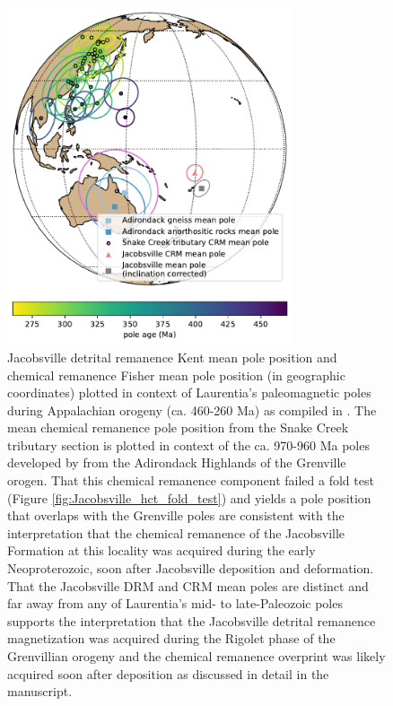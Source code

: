 \begin{figure}
\centering
\includegraphics[width=0.75\textwidth]{figure/Zhang2024a/SI_Jacobsville_vs_Appalachian_poles.pdf}
\caption[Jacobsville detrital remanence pole position in context of Laurentia's paleomagnetic poles during the Appalachian orogeny (ca. 460-260 Ma)]{Jacobsville detrital remanence Kent mean pole position and chemical remanence Fisher mean pole position (in geographic coordinates) plotted in context of Laurentia's paleomagnetic poles during Appalachian orogeny (ca. 460-260 Ma) as compiled in \cite{Torsvik2012a}. The mean chemical remanence pole position from the Snake Creek tributary section is plotted in context of the ca. 970-960 Ma poles developed by \cite{Brown2012a} from the Adirondack Highlands of the Grenville orogen. That this chemical remanence component failed a fold test (Figure \ref{fig:Jacobsville_hct_fold_test}) and yields a pole position that overlaps with the Grenville poles are consistent with the interpretation that the chemical remanence of the Jacobsville Formation at this locality was acquired  during the early Neoproterozoic, soon after Jacobsville deposition and deformation. That the Jacobsville DRM and CRM mean poles are distinct and far away from any of Laurentia's mid- to late-Paleozoic poles supports the interpretation that the Jacobsville detrital remanence magnetization was acquired during the Rigolet phase of the Grenvillian orogeny and the chemical remanence overprint was likely acquired soon after deposition as discussed in detail in the manuscript.}
\label{fig:Jacobsville_Appalachian}
\end{figure}

